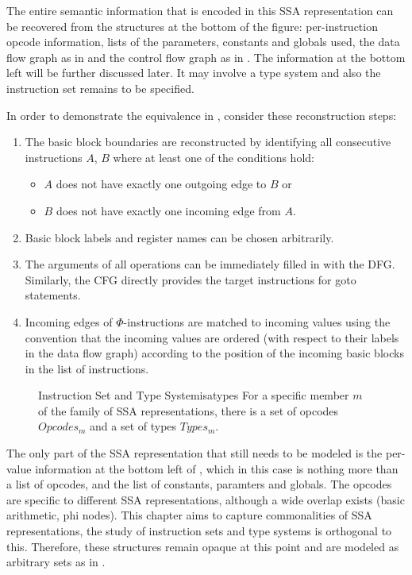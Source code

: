     The entire semantic information that is encoded in this SSA representation
    can be recovered from the structures at the bottom of the figure:
    per-instruction opcode information, lists of the parameters, constants and
    globals used, the data flow graph as in  and the control
    flow graph as in .
    The information at the bottom left will be further discussed later.
    It may involve a type system and also the instruction set remains to be
    specified.

    In order to demonstrate the equivalence in ,
    consider these reconstruction steps:
\begin{enumerate}
    \item The basic block boundaries are reconstructed by identifying all
          consecutive instructions $A$, $B$ where at least one of the
    conditions hold:
    \begin{itemize}
        \item $A$ does not have exactly one outgoing edge to $B$ or
        \item $B$ does not have exactly one incoming edge from $A$.
    \end{itemize}
    \item Basic block labels and register names can be chosen arbitrarily.
    \item The arguments of all operations can be immediately filled in with the 
          DFG. Similarly, the CFG directly provides the target instructions
          for goto statements.
    \item Incoming edges of $\Phi$-instructions are matched to incoming values
          using the convention that the incoming values are ordered
          (with respect to their labels in the data flow graph) according to the
          position of the incoming basic blocks in the list of instructions.
\end{enumerate}

\begin{figure}[b]
\begin{definition}{Instruction Set and Type System}{isatypes}
    For a specific member $m$ of the family of SSA representations, there is
    a set of opcodes $Opcodes_m$ and a set of types $Types_m$.
\end{definition}
\end{figure}

    The only part of the SSA representation that still needs to be modeled is
    the per-value information at the bottom left of ,
    which in this case is nothing more than a list of opcodes, and the list of
    constants, paramters and globals.
    The opcodes are specific to different SSA representations, although a wide
    overlap exists (basic arithmetic, phi nodes).
    This chapter aims to capture commonalities of SSA representations, the study
    of instruction sets and type systems is orthogonal to this.
    Therefore, these structures remain opaque at this point and are modeled as
    arbitrary sets as in .

